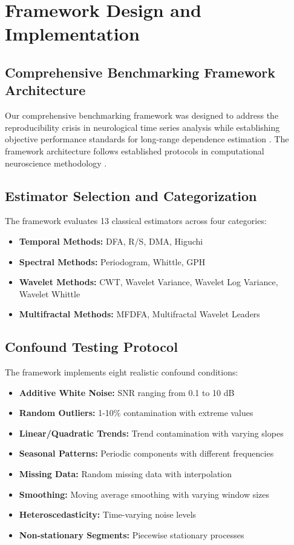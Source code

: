 \section{Framework Design and Implementation}

\subsection{Comprehensive Benchmarking Framework Architecture}

Our comprehensive benchmarking framework was designed to address the reproducibility crisis in neurological time series analysis while establishing objective performance standards for long-range dependence estimation \citep{Harris2020, Virtanen2020}. The framework architecture follows established protocols in computational neuroscience methodology \citep{Marasco2012, Bouteiller2011}.

\subsection{Estimator Selection and Categorization}

The framework evaluates 13 classical estimators across four categories:

\begin{itemize}
    \item \textbf{Temporal Methods:} DFA, R/S, DMA, Higuchi
    \item \textbf{Spectral Methods:} Periodogram, Whittle, GPH
    \item \textbf{Wavelet Methods:} CWT, Wavelet Variance, Wavelet Log Variance, Wavelet Whittle
    \item \textbf{Multifractal Methods:} MFDFA, Multifractal Wavelet Leaders
\end{itemize}

\subsection{Confound Testing Protocol}

The framework implements eight realistic confound conditions:

\begin{itemize}
    \item \textbf{Additive White Noise:} SNR ranging from 0.1 to 10 dB
    \item \textbf{Random Outliers:} 1-10\% contamination with extreme values
    \item \textbf{Linear/Quadratic Trends:} Trend contamination with varying slopes
    \item \textbf{Seasonal Patterns:} Periodic components with different frequencies
    \item \textbf{Missing Data:} Random missing data with interpolation
    \item \textbf{Smoothing:} Moving average smoothing with varying window sizes
    \item \textbf{Heteroscedasticity:} Time-varying noise levels
    \item \textbf{Non-stationary Segments:} Piecewise stationary processes
\end{itemize}

